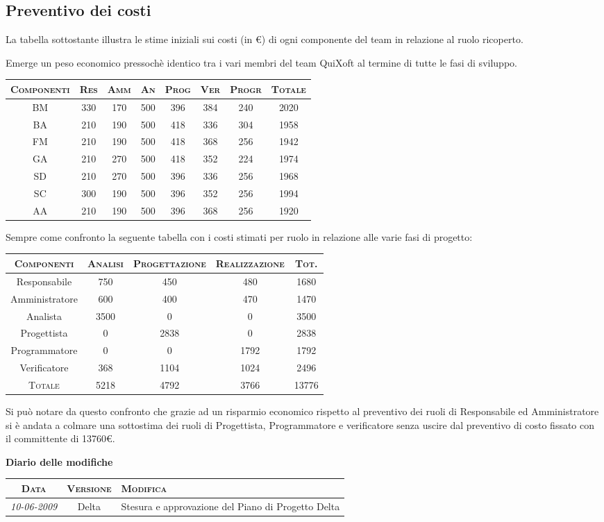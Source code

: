 \documentclass[11pt,a4paper]{article}
\newcommand{\modifiche}
{
\newpage
\begin{center}
\textbf{Diario delle modifiche} \\
\bigskip
\begin{tabular}{|c|c|p{0.62\textwidth}|}
\hline
\textsc{Data} & \textsc{Versione} & \textsc{Modifica} \\
\hline
\hline
\textit{10-06-2009} & Delta & Stesura e approvazione del Piano di Progetto Delta\\
\hline
\end{tabular}
\end{center}
}
\begin{document}
\subsection{Preventivo dei costi}
La tabella sottostante illustra le stime iniziali sui costi (in \euro) di ogni componente del team in relazione al ruolo ricoperto.

Emerge un peso economico pressochè identico tra i vari membri del team QuiXoft al termine di tutte le fasi di sviluppo.
\bigskip
\begin{center}
\begin{tabular}{|c||c|c|c|c|c|c||c|}
\hline
\textsc{Componenti} & \textsc{Res} & \textsc{Amm} & \textsc{An} & \textsc{Prog} & \textsc{Ver} & \textsc{Progr} & \textsc{Totale}\\
\hline \hline
BM & 330 & 170 & 500 & 396 & 384 & 240 & 2020 \\ \hline
BA & 210 & 190 & 500 & 418 & 336 & 304 & 1958 \\ \hline
FM & 210 & 190 & 500 & 418 & 368 & 256 & 1942 \\ \hline
GA & 210 & 270 & 500 & 418 & 352 & 224 & 1974 \\ \hline
SD & 210 & 270 & 500 & 396 & 336 & 256 & 1968 \\ \hline
SC & 300 & 190 & 500 & 396 & 352 & 256 & 1994 \\ \hline
AA & 210 & 190 & 500 & 396 & 368 & 256 & 1920 \\ \hline
\end{tabular}
\end{center}
\bigskip
Sempre come confronto la seguente tabella con i costi stimati per ruolo in relazione alle varie fasi di progetto:

\begin{center}
\begin{tabular}{|c||c|c|c||c|}
\hline
\textsc{Componenti}& \textsc{Analisi} & \textsc{Progettazione} & \textsc{Realizzazione} & \textsc{Tot.} \\ \hline \hline
Responsabile & 750 & 450 & 480 & 1680 \\ \hline
Amministratore & 600 & 400 & 470 & 1470 \\ \hline
Analista & 3500 & 0 & 0 & 3500 \\ \hline
Progettista & 0 & 2838 & 0 & 2838 \\ \hline
Programmatore & 0 & 0 & 1792 & 1792 \\ \hline
Verificatore & 368 & 1104 & 1024 & 2496 \\ \hline \hline
\textsc{Totale} & 5218 & 4792 & 3766 & 13776 \\ \hline
\end{tabular}
\end{center}
Si può notare da questo confronto che grazie ad un risparmio economico rispetto al preventivo dei ruoli di Responsabile ed Amministratore si è andata a colmare una sottostima dei ruoli di Progettista, Programmatore e verificatore senza uscire dal preventivo di costo fissato con il committente di 13760\euro.
\modifiche
\end{document}
